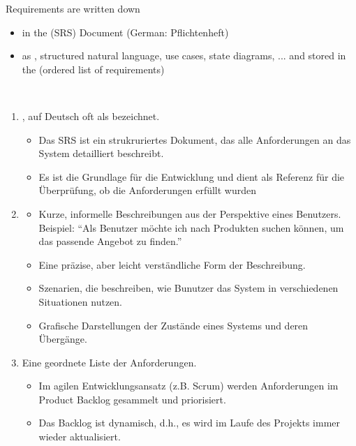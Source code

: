 \clearpage
Requirements are written down
\begin{itemize}
	\item in the  (SRS) Document (German: Pflichtenheft)
	\item as , structured natural language, use cases, state diagrams, ... and stored in the  (ordered list of requirements)
\end{itemize}
\begin{infoBox}
    \\
    \begin{enumerate}
        \item {}, auf Deutsch oft als  bezeichnet.
        \begin{itemize}
            \item Das SRS ist ein strukruriertes Dokument, das alle Anforderungen an das System detailliert beschreibt.
            \item Es ist die Grundlage für die Entwicklung und dient als Referenz für die Überprüfung, ob die Anforderungen erfüllt wurden
        \end{itemize}
        \item {}
        \begin{itemize}
            \item {} Kurze, informelle Beschreibungen aus der Perspektive eines Benutzers. Beispiel: \enquote{Als Benutzer möchte ich nach Produkten suchen können, um das passende Angebot zu finden.}
            \item {} Eine präzise, aber leicht verständliche Form der Beschreibung.
            \item {} Szenarien, die beschreiben, wie Bunutzer das System in verschiedenen Situationen nutzen.
            \item {} Grafische Darstellungen der Zustände eines Systems und deren Übergänge.
        \end{itemize}
        \item {} Eine geordnete Liste der Anforderungen.
        \begin{itemize}
            \item Im agilen Entwicklungsansatz (z.B. Scrum) werden Anforderungen im Product Backlog gesammelt und priorisiert.
            \item Das Backlog ist dynamisch, d.h., es wird im Laufe des Projekts immer wieder aktualisiert.
        \end{itemize}
    \end{enumerate}
\end{infoBox}
